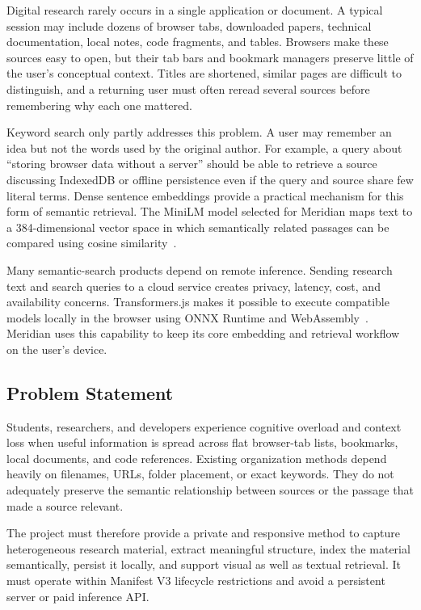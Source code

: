 \documentclass{tietreport}
\begin{document}
Digital research rarely occurs in a single application or document. A typical session may
include dozens of browser tabs, downloaded papers, technical documentation, local notes,
code fragments, and tables. Browsers make these sources easy to open, but their tab bars and
bookmark managers preserve little of the user's conceptual context. Titles are shortened,
similar pages are difficult to distinguish, and a returning user must often reread several
sources before remembering why each one mattered.

Keyword search only partly addresses this problem. A user may remember an idea but not the
words used by the original author. For example, a query about ``storing browser data without
a server'' should be able to retrieve a source discussing IndexedDB or offline persistence
even if the query and source share few literal terms. Dense sentence embeddings provide a
practical mechanism for this form of semantic retrieval. The MiniLM model selected for
Meridian maps text to a 384-dimensional vector space in which semantically related passages
can be compared using cosine similarity~\cite{minilm,transformersjs}.

Many semantic-search products depend on remote inference. Sending research text and search
queries to a cloud service creates privacy, latency, cost, and availability concerns.
Transformers.js makes it possible to execute compatible models locally in the browser using
ONNX Runtime and WebAssembly~\cite{transformersjs,onnxruntime}. Meridian uses this capability
to keep its core embedding and retrieval workflow on the user's device.

\subsection{Problem Statement}

Students, researchers, and developers experience cognitive overload and context loss when
useful information is spread across flat browser-tab lists, bookmarks, local documents, and
code references. Existing organization methods depend heavily on filenames, URLs, folder
placement, or exact keywords. They do not adequately preserve the semantic relationship
between sources or the passage that made a source relevant.

The project must therefore provide a private and responsive method to capture heterogeneous
research material, extract meaningful structure, index the material semantically, persist it
locally, and support visual as well as textual retrieval. It must operate within Manifest V3
lifecycle restrictions and avoid a persistent server or paid inference API.
\end{document}
